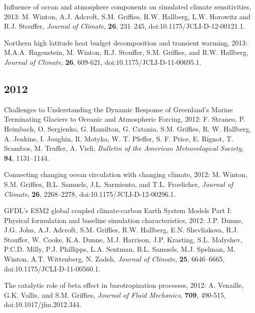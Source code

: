 \begin{etaremune}
\item Influence of ocean and atmosphere components on simulated climate sensitivities, 2013: M. Winton, A.J. Adcroft, S.M. Grif\/f\/ies, R.W. Hallberg, L.W. Horowitz and R.J. Stouffer, {\it Journal of Climate}, {\bf 26}, 231--245,  doi:10.1175/JCLI-D-12-00121.1.

\item Northern high latitude heat budget decomposition and transient warming, 2013: M.A.A. Rugenstein, M. Winton, R.J. Stouffer, S.M. Grif\/f\/ies, and R.W. Hallberg, {\it Journal of Climate}, {\bf 26}, 609-621, doi:10.1175/JCLI-D-11-00695.1.


\subsection*{\sc \color{Maroon} 2012}

\item Challenges to Understanding the Dynamic Response of Greenland's Marine Terminating Glaciers to Oceanic and Atmospheric Forcing, 2012: F. Straneo, P. Heimbach, O. Sergienko, G. Hamilton, G. Catania, S.M. Grif\/f\/ies, R. W. Hallberg, A. Jenkins, I. Joughin, R. Motyka, W. T. Pfeffer, S. F. Price, E. Rignot, T. Scambos, M. Truffer, A. Vieli, {\it Bulletin of the American Meteorological Society}, {\bf 94}, 1131--1144.

\item Connecting changing ocean circulation with changing climate, 2012: M. Winton, S.M. Grif\/f\/ies, B.L. Samuels, J.L. Sarmiento, and T.L. Froelicher, {\it Journal of Climate}, {\bf 26}, 2268--2278, doi:10.1175/JCLI-D-12-00296.1.

\item GFDL’s ESM2 global coupled climate-carbon Earth System Models Part I: Physical formulation and baseline simulation  characteristics, 2012: J.P. Dunne, J.G. John, A.J. Adcroft, S.M. Grif\/f\/ies, R.W. Hallberg, E.N. Shevliakova, R.J. Stouffer,
  W. Cooke, K.A. Dunne, M.J. Harrison, J.P. Krasting, S.L. Malyshev, P.C.D. Milly, P.J. Phillipps, L.A. Sentman, B.L. Samuels,  M.J. Spelman, M. Winton, A.T. Wittenberg, N. Zadeh, {\it Journal of Climate}, {\bf 25}, 6646--6665, doi:10.1175/JCLI-D-11-00560.1.

\item The catalytic role of beta effect in barotropization processes,  2012: A. Venaille, G.K. Vallis, and S.M. Grif\/f\/ies, {\it  Journal of Fluid Mechanics}, {\bf 709}, 490-515, doi:10.1017/jfm.2012.344.


\end{etaremune}
